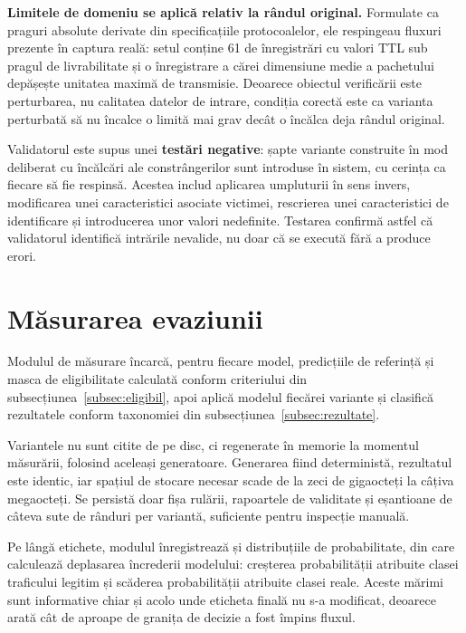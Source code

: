 \textbf{Limitele de domeniu se aplică relativ la rândul original.} Formulate ca praguri absolute derivate din specificațiile protocoalelor, ele respingeau fluxuri prezente în captura reală: setul conține 61 de înregistrări cu valori TTL sub pragul de livrabilitate și o înregistrare a cărei dimensiune medie a pachetului depășește unitatea maximă de transmisie. Deoarece obiectul verificării este perturbarea, nu calitatea datelor de intrare, condiția corectă este ca varianta perturbată să nu încalce o limită mai grav decât o încălca deja rândul original.

Validatorul este supus unei \textbf{testări negative}: șapte variante construite în mod deliberat cu încălcări ale constrângerilor sunt introduse în sistem, cu cerința ca fiecare să fie respinsă. Acestea includ aplicarea umpluturii în sens invers, modificarea unei caracteristici asociate victimei, rescrierea unei caracteristici de identificare și introducerea unor valori nedefinite. Testarea confirmă astfel că validatorul identifică intrările nevalide, nu doar că se execută fără a produce erori.

\section{Măsurarea evaziunii}\label{sec:implmasurare}

Modulul de măsurare încarcă, pentru fiecare model, predicțiile de referință și masca de eligibilitate calculată conform criteriului din subsecțiunea~\ref{subsec:eligibil}, apoi aplică modelul fiecărei variante și clasifică rezultatele conform taxonomiei din subsecțiunea~\ref{subsec:rezultate}.

Variantele nu sunt citite de pe disc, ci regenerate în memorie la momentul măsurării, folosind aceleași generatoare. Generarea fiind deterministă, rezultatul este identic, iar spațiul de stocare necesar scade de la zeci de gigaocteți la câțiva megaocteți. Se persistă doar fișa rulării, rapoartele de validitate și eșantioane de câteva sute de rânduri per variantă, suficiente pentru inspecție manuală.

Pe lângă etichete, modulul înregistrează și distribuțiile de probabilitate, din care calculează deplasarea încrederii modelului: creșterea probabilității atribuite clasei traficului legitim și scăderea probabilității atribuite clasei reale. Aceste mărimi sunt informative chiar și acolo unde eticheta finală nu s-a modificat, deoarece arată cât de aproape de granița de decizie a fost împins fluxul.

